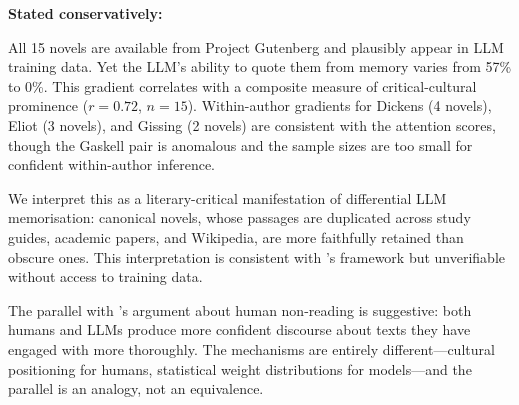\textbf{Stated conservatively:}

All 15 novels are available from Project Gutenberg and plausibly
appear in LLM training data.  Yet the LLM's ability to quote them from
memory varies from 57\% to 0\%.  This gradient correlates with a
composite measure of critical-cultural prominence ($r = 0.72$,
$n = 15$).  Within-author gradients for Dickens (4 novels), Eliot
(3 novels), and Gissing (2 novels) are consistent with the attention
scores, though the Gaskell pair is anomalous and the sample sizes are
too small for confident within-author inference.

We interpret this as a literary-critical manifestation of differential
LLM memorisation: canonical novels, whose passages are duplicated
across study guides, academic papers, and Wikipedia, are more
faithfully retained than obscure ones.  This interpretation is
consistent with \textcite{carlini2023quantifying}'s framework but
unverifiable without access to training data.

The parallel with \textcite{bayard2007comment}'s argument about human
non-reading is suggestive: both humans and LLMs produce more confident
discourse about texts they have engaged with more thoroughly.  The
mechanisms are entirely different---cultural positioning for humans,
statistical weight distributions for models---and the parallel is an
analogy, not an equivalence.
